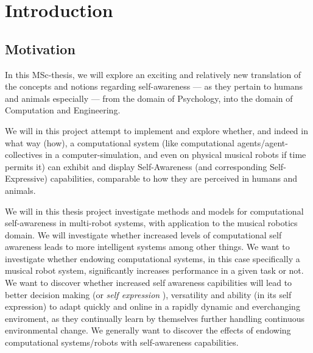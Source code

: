 \chapter{Introduction}
\label{chap:introduction}	


	
	




\section{Motivation}

In this MSc-thesis, we will explore an exciting and relatively new translation of the concepts and notions regarding self-awareness — as they pertain to humans and animals especially — from the domain of Psychology, into the domain of Computation and Engineering.

We will in this project attempt to implement and explore whether, and indeed in what way (how), a computational system (like computational agents/agent-collectives in a computer-simulation, and even on physical musical robots if time permits it) can exhibit and display Self-Awareness (and corresponding Self-Expressive) capabilities, comparable to how they are perceived in humans and animals.

We will in this thesis project investigate methods and models for computational self-awareness in multi-robot systems, with application to the musical robotics domain. We will investigate whether increased levels of computational self awareness leads to more intelligent systems among other things. We want to investigate whether endowing computational systems, in this case specifically a musical robot system, significantly increases performance in a given task or not. We want to discover whether increased self awareness capibilities will lead to better decision making (or \textit{self expression} \cite{sacs16_ch2}), versatility and ability (in its self expression) to adapt quickly and online in a rapidly dynamic and everchanging enviroment, as they continually learn by themselves further handling continuous environmental change. We generally want to discover the effects of endowing computational systems/robots with self-awareness capabilities.

